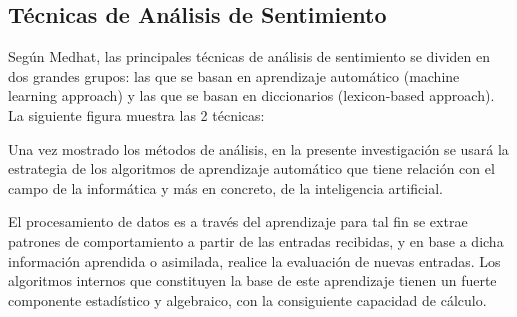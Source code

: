 \subsection{T\'ecnicas de An\'alisis de Sentimiento}

Seg\'un Medhat, las principales t\'ecnicas de an\'alisis de sentimiento se dividen en dos grandes grupos: las que se basan en aprendizaje autom\'atico (machine learning approach) y las que se basan en diccionarios (lexicon-based approach). \\

La siguiente figura muestra las 2 técnicas:


Una vez mostrado los m\'etodos de an\'alisis, en la presente investigación se usará la estrategia de los algoritmos de aprendizaje automático que tiene relación con el campo de la informática y más en concreto, de la inteligencia artificial.

 El procesamiento de datos es a trav\'es del aprendizaje para tal fin se extrae patrones de comportamiento a partir de las entradas recibidas, y en base a dicha informaci\'on aprendida o asimilada, realice la evaluaci\'on de nuevas entradas. Los algoritmos internos que constituyen la base de este aprendizaje tienen un fuerte componente estad\'istico y algebraico, con la consiguiente capacidad de c\'alculo.



\cleardoublepage